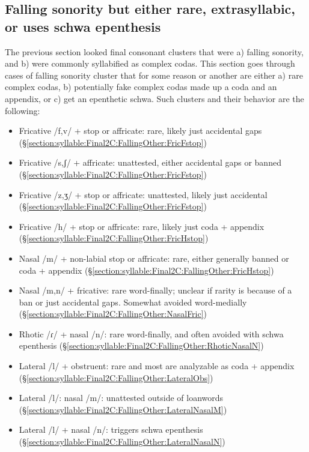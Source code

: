 	
	\subsection{Falling sonority but either rare,  extrasyllabic, or uses schwa epenthesis }\label{section:syllable:Final2C:FallingOther}
	The previous section looked final consonant clusters that were a) falling sonority, and b) were commonly syllabified as complex codas. This section goes through cases of falling sonority cluster that for some reason or another are either a) rare complex codas, b) potentially fake complex codas made up a coda and an appendix, or c) get an epenthetic schwa. Such clusters and their behavior are the following: 
	
	\begin{itemize}[noitemsep,topsep=0pt]
		\item Fricative /f,v/ + stop or affricate: rare, likely just accidental gaps (\S\ref{section:syllable:Final2C:FallingOther:FricFstop})
		\item Fricative /s,ʃ/ +     affricate: unattested, either   accidental gaps or banned (\S\ref{section:syllable:Final2C:FallingOther:FricFstop})
		\item Fricative /z,ʒ/ +     stop or affricate: unattested, likely  just  accidental  (\S\ref{section:syllable:Final2C:FallingOther:FricFstop})
		\item Fricative /h/ +     stop or affricate: rare, likely just coda + appendix  (\S\ref{section:syllable:Final2C:FallingOther:FricHstop})
		\item Nasal /m/ +    non-labial stop or affricate: rare, either generally banned or coda  + appendix  (\S\ref{section:syllable:Final2C:FallingOther:FricHstop})
		\item Nasal /m,n/ +    fricative: rare   word-finally; unclear if rarity is because of a ban or   just accidental gaps. Somewhat   avoided   word-medially  (\S\ref{section:syllable:Final2C:FallingOther:NasalFric})
		\item Rhotic /ɾ/ + nasal  /n/:  rare   word-finally, and often avoided with schwa epenthesis  (\S\ref{section:syllable:Final2C:FallingOther:RhoticNasalN})
		\item Lateral /l/ + obstruent: rare and most are analyzable as coda + appendix  (\S\ref{section:syllable:Final2C:FallingOther:LateralObs})
		\item Lateral /l/: nasal /m/: unattested outside of loanwords  (\S\ref{section:syllable:Final2C:FallingOther:LateralNasalM})
		\item Lateral /l/ + nasal /n/:  triggers    schwa epenthesis (\S\ref{section:syllable:Final2C:FallingOther:LateralNasalN})
	\end{itemize}
	
